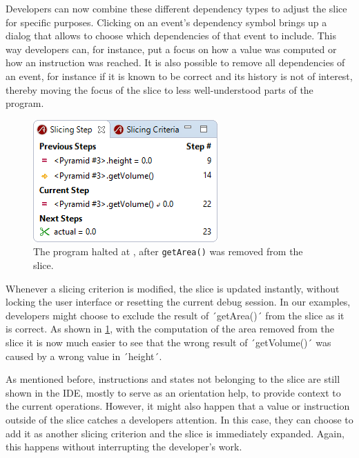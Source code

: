 ﻿\documentclass[
      english,
			conference,
      ]{IEEEtran}
\begin{document}
Developers can now combine these different dependency types to adjust the slice for specific purposes.
Clicking on an event's dependency symbol brings up a dialog that allows to choose which dependencies of that event to include.
This way developers can, for instance, put a focus on how a value was computed or how an instruction was reached.
It is also possible to remove all dependencies of an event, for instance if it is known to be correct and its history is not of interest, thereby moving the focus of the slice to less well-understood parts of the program.

\begin{figure}
	\centering
		\includegraphics[width=0.80\linewidth]{slice2.png}
	\caption{The program halted at , after \lstinline{getArea()} was removed from the slice.}
	\label{fig:slice2}
\end{figure}

Whenever a slicing criterion is modified, the slice is updated instantly, without locking the user interface or resetting the current debug session.
In our examples, developers might choose to exclude the result of ´getArea()´ from the slice as it is correct.
As shown in \cref{fig:slice2}, with the computation of the area removed from the slice it is now much easier to see that the wrong result of ´getVolume()´ was caused by a wrong value in ´height´.

As mentioned before, instructions and states not belonging to the slice are still shown in the IDE, mostly to serve as an orientation help, to provide context to the current operations.
However, it might also happen that a value or instruction outside of the slice catches a developers attention.
In this case, they can choose to add it as another slicing criterion and the slice is immediately expanded.
Again, this happens without interrupting the developer's work.
\end{document}
